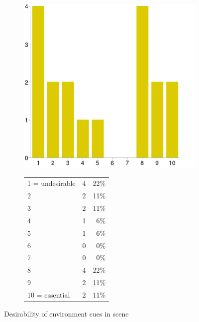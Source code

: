 \documentclass[MSc,paper=a4,pagesize=auto]{icldt}
\begin{document}
\begin{figure}[htbp!]
\centering
\begin{subfigure}{0.4\textwidth}
    \centering
    \includegraphics[width=1\linewidth]{resources/16-want_cues}
\end{subfigure}%
\centering
\begin{subfigure}{\textwidth}
    \centering
   	\begin{tabular}{ l c r }
1 = undesirable&4&22\% \\
2&2&11\% \\
3&2&11\% \\
4&1&6\% \\
5&1&6\% \\
6&0&0\% \\
7&0&0\% \\
8&4&22\% \\
9&2&11\% \\
10 = essential&2&11\% \\
\end{tabular}
\end{subfigure} 
    \caption{Desirability of environment cues in scene}
    \label{fig:16-want_cues}
\end{figure}

\end{document}
